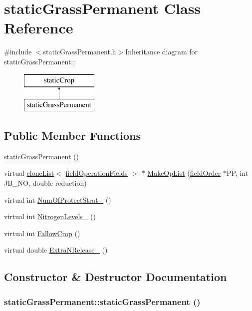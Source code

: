 \hypertarget{classstatic_grass_permanent}{
\section{staticGrassPermanent Class Reference}
\label{classstatic_grass_permanent}
}


{\ttfamily \#include $<$staticGrassPermanent.h$>$}Inheritance diagram for staticGrassPermanent::\begin{figure}[H]
\begin{center}
\leavevmode
\includegraphics[height=2cm]{classstatic_grass_permanent}
\end{center}
\end{figure}
\subsection*{Public Member Functions}
\begin{DoxyCompactItemize}
\item 
\hyperlink{classstatic_grass_permanent_a77cbb1c8ae19d5e7c4217a35521cd1d4}{staticGrassPermanent} ()
\item 
virtual \hyperlink{classclone_list}{cloneList}$<$ \hyperlink{classfield_operation_fields}{fieldOperationFields} $>$ $\ast$ \hyperlink{classstatic_grass_permanent_a382ae95421ef703e3d710a792c1604c7}{MakeOpList} (\hyperlink{classfield_order}{fieldOrder} $\ast$PP, int JB\_\-NO, double reduction)
\item 
virtual int \hyperlink{classstatic_grass_permanent_a5af2b1a01c23e599e7391e972c15cbba}{NumOfProtectStrat\_\-} ()
\item 
virtual int \hyperlink{classstatic_grass_permanent_a4e133fb5bd5133df57babfd2852fb466}{NitrogenLevels\_\-} ()
\item 
virtual int \hyperlink{classstatic_grass_permanent_a0c8521795691964d29dbb11d78c45ef9}{FallowCrop} ()
\item 
virtual double \hyperlink{classstatic_grass_permanent_a9f31a10c51ef98d46230e6a9a74816ba}{ExtraNRelease\_\-} ()
\end{DoxyCompactItemize}


\subsection{Constructor \& Destructor Documentation}
\hypertarget{classstatic_grass_permanent_a77cbb1c8ae19d5e7c4217a35521cd1d4}{
\subsubsection[{staticGrassPermanent}]{\setlength{\rightskip}{0pt plus 5cm}staticGrassPermanent::staticGrassPermanent ()}}
\label{classstatic_grass_permanent_a77cbb1c8ae19d5e7c4217a35521cd1d4}


